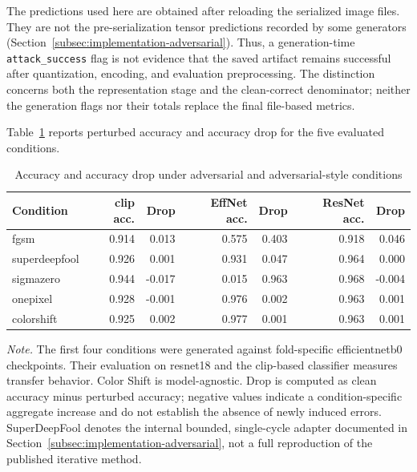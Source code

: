 The predictions used here are obtained after reloading the serialized image
files. They are not the pre-serialization tensor predictions recorded by some
generators (Section~\ref{subsec:implementation-adversarial}). Thus, a
generation-time \texttt{attack\_success} flag is not evidence that the saved
artifact remains successful after quantization, encoding, and evaluation
preprocessing. The distinction concerns both the representation stage and the
clean-correct denominator; neither the generation flags nor their totals
replace the final file-based metrics.

Table~\ref{tab:results-adversarial-robustness} reports perturbed accuracy and
accuracy drop for the five evaluated conditions.

\begin{table}[H]
\centering
\scriptsize
\setlength{\tabcolsep}{3.3pt}
\renewcommand{\arraystretch}{1.15}
\caption{Accuracy and accuracy drop under adversarial and adversarial-style
conditions}
\label{tab:results-adversarial-robustness}
\begin{tabular}{@{}l r r r r r r@{}}
\toprule
\textbf{Condition} &
\textbf{\gls{clip} acc.} &
\textbf{Drop} &
\textbf{EffNet acc.} &
\textbf{Drop} &
\textbf{ResNet acc.} &
\textbf{Drop} \\
\midrule

\gls{fgsm}
& 0.914
& 0.013
& 0.575
& 0.403
& 0.918
& 0.046 \\

\gls{superdeepfool}
& 0.926
& 0.001
& 0.931
& 0.047
& 0.964
& 0.000 \\

\gls{sigmazero}
& 0.944
& -0.017
& 0.015
& 0.963
& 0.968
& -0.004 \\

\gls{onepixel}
& 0.928
& -0.001
& 0.976
& 0.002
& 0.963
& 0.001 \\

\gls{colorshift}
& 0.925
& 0.002
& 0.977
& 0.001
& 0.963
& 0.001 \\

\bottomrule
\end{tabular}

\vspace{0.4em}
\footnotesize
\textit{Note.} The first four conditions were generated against fold-specific
\gls{efficientnetb0} checkpoints. Their evaluation on \gls{resnet18} and the
\acrshort{clip}-based classifier measures transfer behavior. Color Shift is
model-agnostic. Drop is computed as clean accuracy minus perturbed accuracy;
negative values indicate a condition-specific aggregate increase and do not
establish the absence of newly induced errors.
SuperDeepFool denotes the internal bounded, single-cycle adapter documented in
Section~\ref{subsec:implementation-adversarial}, not a full reproduction of the
published iterative method.
\end{table}

